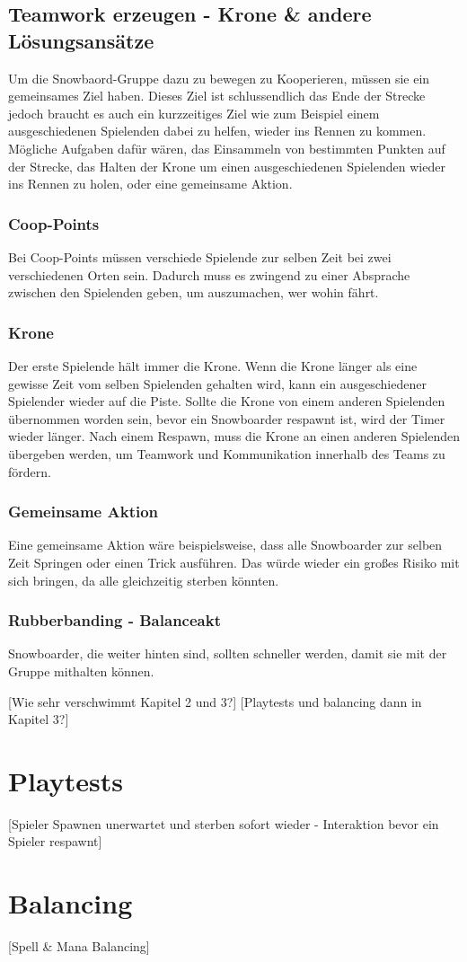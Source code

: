 \subsection{Teamwork erzeugen - Krone \& andere Lösungsansätze\label{_teamwork_erzeugen}}
Um die Snowbaord-Gruppe dazu zu bewegen zu Kooperieren, müssen sie ein gemeinsames Ziel haben. Dieses Ziel ist schlussendlich das Ende der Strecke jedoch braucht es auch ein kurzzeitiges Ziel wie zum Beispiel einem ausgeschiedenen Spielenden dabei zu helfen, wieder ins Rennen zu kommen. Mögliche Aufgaben dafür wären, das Einsammeln von bestimmten Punkten auf der Strecke, das Halten der Krone um einen ausgeschiedenen Spielenden wieder ins Rennen zu holen, oder eine gemeinsame Aktion.

\subsubsection{Coop-Points}
Bei Coop-Points müssen verschiede Spielende zur selben Zeit bei zwei verschiedenen Orten sein. Dadurch muss es zwingend zu einer Absprache zwischen den Spielenden geben, um auszumachen, wer wohin fährt.

\subsubsection{Krone}
Der erste Spielende hält immer die Krone. Wenn die Krone länger als eine gewisse Zeit vom selben Spielenden gehalten wird, kann ein ausgeschiedener Spielender wieder auf die Piste. Sollte die Krone von einem anderen Spielenden übernommen worden sein, bevor ein Snowboarder respawnt ist, wird der Timer wieder länger. Nach einem Respawn, muss die Krone an einen anderen Spielenden übergeben werden, um Teamwork und Kommunikation innerhalb des Teams zu fördern.

\subsubsection{Gemeinsame Aktion}
Eine gemeinsame Aktion wäre beispielsweise, dass alle Snowboarder zur selben Zeit Springen oder einen Trick ausführen. Das würde wieder ein großes Risiko mit sich bringen, da alle gleichzeitig sterben könnten.

\subsubsection{Rubberbanding - Balanceakt}
Snowboarder, die weiter hinten sind, sollten schneller werden, damit sie mit der Gruppe mithalten können. 

[Wie sehr verschwimmt Kapitel 2 und 3?]
[Playtests und balancing dann in Kapitel 3?]

\section{Playtests}

[Spieler Spawnen unerwartet und sterben sofort wieder - Interaktion bevor ein Spieler respawnt]

\section{Balancing}

[Spell \& Mana Balancing]
